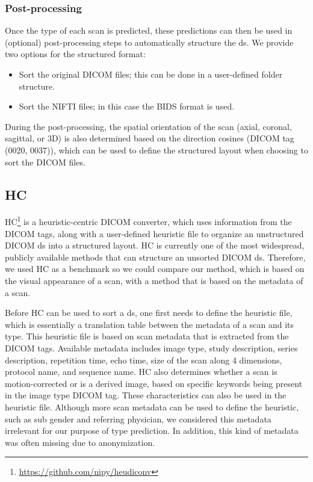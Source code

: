 \subsubsection{Post-processing}

Once the \gls{type} of each \gls{scan} is predicted, these predictions can then be used in (optional) post-processing steps to automatically structure the \gls{ds}.
We provide two options for the structured format:

\begin{itemize}
    \item Sort the original \gls{DICOM} files; this can be done in a user-defined folder structure.
    \item Sort the \gls{NIFTI} files; in this case the \gls{BIDS} format is used.
\end{itemize}

During the post-processing, the spatial orientation of the \gls{scan} (axial, coronal, sagittal, or 3D) is also determined based on the direction cosines (\gls{DICOM} tag (0020, 0037)), which can be used to define the structured layout when choosing to sort the \gls{DICOM} files.

\subsection{\acrlong{HC}}
\gls{HC}\footnote{\url{https://github.com/nipy/heudiconv}} is a heuristic-centric \gls{DICOM} converter, which uses information from the \gls{DICOM} tags, along with a user-defined heuristic file to organize an unstructured \gls{DICOM} \gls{ds} into a structured layout.
\gls{HC} is currently one of the most widespread, publicly available methods that can structure an unsorted \gls{DICOM} \gls{ds}.
Therefore, we used \gls{HC} as a benchmark so we could compare our method, which is based on the visual appearance of a \gls{scan}, with a method that is based on the metadata of a \gls{scan}.

Before \gls{HC} can be used to sort a \gls{ds}, one first needs to define the heuristic file, which is essentially a translation table between the metadata of a \gls{scan} and its \gls{type}.
This heuristic file is based on \gls{scan} metadata that is extracted from the \gls{DICOM} tags.
Available metadata includes image type, study description, series description, repetition time, echo time, size of the \gls{scan} along 4 dimensions, protocol name, and sequence name.
\gls{HC} also determines whether a \gls{scan} is motion-corrected or is a derived image, based on specific keywords being present in the image type \gls{DICOM} tag.
These characteristics can also be used in the heuristic file.
Although more \gls{scan} metadata can be used to define the heuristic, such as \gls{sub} gender and referring physician, we considered this metadata irrelevant for our purpose of \gls{type} prediction.
In addition, this kind of metadata was often missing due to anonymization.




